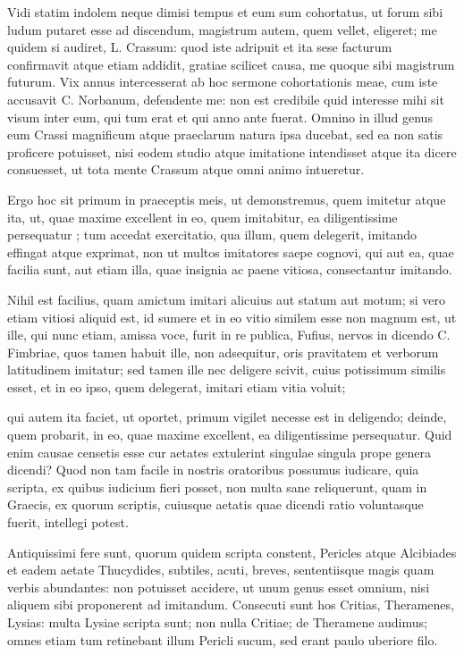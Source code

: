  Vidi statim indolem neque dimisi tempus et eum sum cohortatus, ut forum sibi ludum putaret esse ad discendum, magistrum autem, quem vellet, eligeret; me quidem si audiret, L. Crassum: quod iste adripuit et ita sese facturum confirmavit atque etiam addidit, gratiae scilicet causa, me quoque sibi magistrum futurum. Vix annus intercesserat ab hoc sermone cohortationis meae, cum iste accusavit C. Norbanum, defendente me: non est credibile quid interesse mihi sit visum inter eum, qui tum erat et qui anno ante fuerat. Omnino in illud genus eum Crassi magnificum atque praeclarum natura ipsa ducebat, sed ea non satis proficere potuisset, nisi eodem studio atque imitatione intendisset atque ita dicere consuesset, ut tota mente Crassum atque omni animo intueretur.

 Ergo hoc sit primum in praeceptis meis, ut demonstremus, quem imitetur atque ita, ut, quae maxime excellent in eo, quem imitabitur, ea diligentissime persequatur ; tum accedat exercitatio, qua illum, quem delegerit, imitando effingat atque exprimat, non ut multos imitatores saepe cognovi, qui aut ea, quae facilia sunt, aut etiam illa, quae insignia ac paene vitiosa, consectantur imitando.

 Nihil est facilius, quam amictum imitari alicuius aut statum aut motum; si vero etiam vitiosi aliquid est, id sumere et in eo vitio similem esse non magnum est, ut ille, qui nunc etiam, amissa voce, furit in re publica, Fufius, nervos in dicendo C. Fimbriae, quos tamen habuit ille, non adsequitur, oris pravitatem et verborum latitudinem imitatur; sed tamen ille nec deligere scivit, cuius potissimum similis esset, et in eo ipso, quem delegerat, imitari etiam vitia voluit;

 qui autem ita faciet, ut oportet, primum vigilet necesse est in deligendo; deinde, quem probarit, in eo, quae maxime excellent, ea diligentissime persequatur. Quid enim causae censetis esse cur aetates extulerint singulae singula prope genera dicendi? Quod non tam facile in nostris oratoribus possumus iudicare, quia scripta, ex quibus iudicium fieri posset, non multa sane reliquerunt, quam in Graecis, ex quorum scriptis, cuiusque aetatis quae dicendi ratio voluntasque fuerit, intellegi potest.

 Antiquissimi fere sunt, quorum quidem scripta constent, Pericles atque Alcibiades et eadem aetate Thucydides, subtiles, acuti, breves, sententiisque magis quam verbis abundantes: non potuisset accidere, ut unum genus esset omnium, nisi aliquem sibi proponerent ad imitandum. Consecuti sunt hos Critias, Theramenes, Lysias: multa Lysiae scripta sunt; non nulla Critiae; de Theramene audimus; omnes etiam tum retinebant illum Pericli sucum, sed erant paulo uberiore filo.

